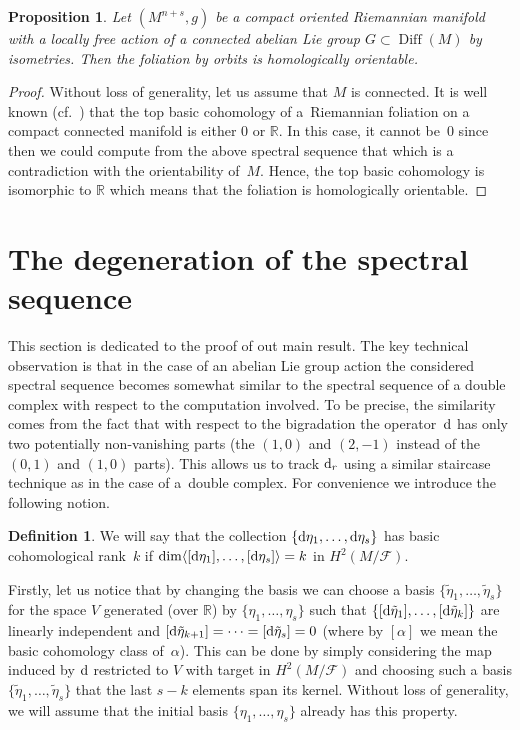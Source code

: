 \documentclass[10pt,a4paper]{amsart}
\numberwithin{equation}{section}
\newtheorem{prop}[tw]{Proposition}
\theoremstyle{definition}
\newtheorem{defi}[tw]{Definition}
\begin{document}
\begin{prop} Let $(M^{n+s},g)$ be a compact oriented Riemannian manifold with a locally free action of a connected abelian Lie group $G\subset \operatorname{Diff}(M)$ by isometries. Then the foliation by orbits is homologically orientable.
\end{prop}

\begin{proof} Without loss of generality, let us assume that $M$ is connected. It is well known (cf.~\cite{E1}) that the top basic cohomology of a~Riemannian foliation on a compact connected manifold is either $0$ or $\mathbb{R}$. In this case, it cannot be~$0$ since then we could compute from the above spectral sequence that  which is a contradiction with the orientability of~$M$. Hence, the top basic cohomology is isomorphic to $\mathbb{R}$ which means that the foliation is homologically orientable.
\end{proof}


\section{The degeneration of the spectral sequence}%
This section is dedicated to the proof of out main result. The key technical observation is that in the case of an abelian Lie group action the considered spectral sequence becomes somewhat similar to the spectral sequence of a double complex with respect to the computation involved. To be precise, the similarity comes from the fact that with respect to the bigradation the operator~${\rm d}$ has only two potentially non-vanishing parts (the $(1,0)$ and $(2,-1)$ instead of the $(0,1)$ and $(1,0)$ parts). This allows us to track ${\rm d}_r$ using a similar staircase technique as in the case of a~double complex. For convenience we introduce the following notion.

\begin{defi}We will say that the collection $\{{\rm d}\eta_1,\dots,{\rm d}\eta_s\}$ has basic cohomological rank~$k$ if $\dim \langle [{\rm d}\eta_1], \dots, [{\rm d}\eta_s] \rangle = k$ in $H^2(M\slash\mathcal{F})$.
\end{defi}

 Firstly, let us notice that by changing the basis we can choose a basis $\{\tilde{\eta}_1,\dots,\tilde{\eta}_s\}$ for the space $V$ generated (over $\mathbb{R}$) by $\{\eta_1,\dots,\eta_s\}$ such that $\{[{\rm d}\tilde{\eta}_1],\dots,[{\rm d}\tilde{\eta}_k]\}$ are linearly independent and $[{\rm d}\tilde{\eta}_{k+1}]=\cdots =[{\rm d}\tilde{\eta}_s]=0$ (where by $[\alpha]$ we mean the basic cohomology class of~$\alpha$). This can be done by simply considering the map induced by ${\rm d}$ restricted to $V$ with target in $H^2(M\slash\mathcal{F})$ and choosing such a basis $\{\tilde{\eta}_1,\dots,\tilde{\eta}_s\}$ that the last $s-k$ elements span its kernel. Without loss of generality, we will assume that the initial basis $\{\eta_1,\dots,\eta_s\}$ already has this property.
\end{document}
